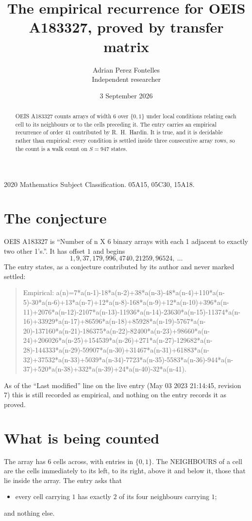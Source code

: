 \documentclass[11pt,a4paper]{article}
\title{The empirical recurrence for OEIS A183327, proved by transfer matrix}
\author{Adrian Perez Fontelles\\ \small Independent researcher}
\date{3 September 2026}
\theoremstyle{plain}
\theoremstyle{definition}
\begin{document}
\maketitle

\begin{abstract}
OEIS A183327 counts arrays of width $6$ over $\{0,1\}$ under local conditions relating each cell
to its neighbours or to the cells preceding it. The entry carries an empirical recurrence of
order $41$ contributed by R.~H.~Hardin. It is true, and it is decidable rather than
empirical: every condition is settled inside three consecutive array rows, so the count is a
walk count on $S=947$ states.
\end{abstract}

\noindent\small 2020 Mathematics Subject Classification. 05A15, 05C30, 15A18.\normalsize

\section{The conjecture}

OEIS A183327 is ``Number of n X 6 binary arrays with each 1 adjacent to exactly two other 1's.''. It has offset $1$ and begins
\[
1, 9, 37, 179, 996, 4740, 21259, 96524,\ \dots
\]
The entry states, as a conjecture contributed by its author and never marked settled:
\begin{quote}
Empirical: a(n)=7*a(n-1)-18*a(n-2)+38*a(n-3)-48*a(n-4)+110*a(n-5)-30*a(n-6)+13*a(n-7)+12*a(n-8)-168*a(n-9)+12*a(n-10)+396*a(n-11)+2076*a(n-12)-2107*a(n-13)-11936*a(n-14)-23630*a(n-15)-11374*a(n-16)+33929*a(n-17)+86596*a(n-18)+85928*a(n-19)-5767*a(n-20)-137160*a(n-21)-186375*a(n-22)-82400*a(n-23)+98660*a(n-24)+206026*a(n-25)+154539*a(n-26)+271*a(n-27)-129682*a(n-28)-144333*a(n-29)-59907*a(n-30)+31467*a(n-31)+61883*a(n-32)+37532*a(n-33)+5039*a(n-34)-7723*a(n-35)-5583*a(n-36)-944*a(n-37)+520*a(n-38)+332*a(n-39)+24*a(n-40)-32*a(n-41).
\end{quote}
As of the ``Last modified'' line on the live entry (May 03 2023 21:14:45, revision 7) this is still
recorded as empirical, and nothing on the entry records it as proved.

\section{What is being counted}

The array has $6$ cells across, with entries in $\{0,1\}$. The NEIGHBOURS of a cell are the
cells immediately to its left, to its right, above it and below it, those that lie inside the
array. The entry asks that
\begin{itemize}
\item every cell carrying $1$ has exactly $2$ of its four neighbours carrying $1$;
\end{itemize}
and nothing else.
\end{document}
